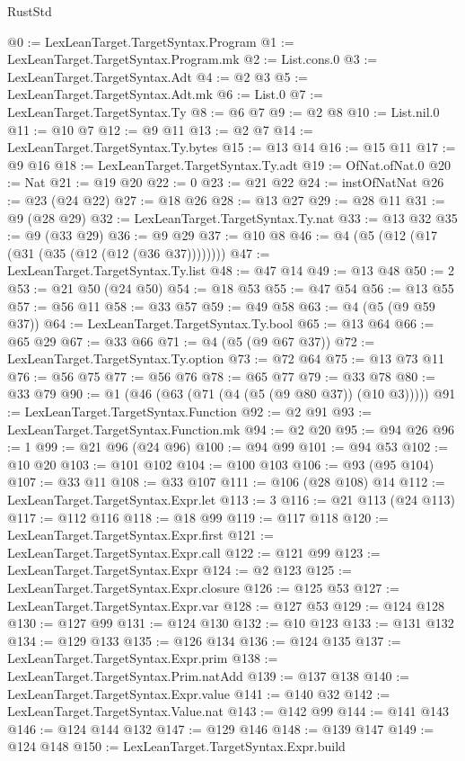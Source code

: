 \begin{lexlean}{RustStd}
\begin{coremodule}
@0 := LexLeanTarget.TargetSyntax.Program
@1 := LexLeanTarget.TargetSyntax.Program.mk
@2 := List.cons.{0}
@3 := LexLeanTarget.TargetSyntax.Adt
@4 := @2 @3
@5 := LexLeanTarget.TargetSyntax.Adt.mk
@6 := List.{0}
@7 := LexLeanTarget.TargetSyntax.Ty
@8 := @6 @7
@9 := @2 @8
@10 := List.nil.{0}
@11 := @10 @7
@12 := @9 @11
@13 := @2 @7
@14 := LexLeanTarget.TargetSyntax.Ty.bytes
@15 := @13 @14
@16 := @15 @11
@17 := @9 @16
@18 := LexLeanTarget.TargetSyntax.Ty.adt
@19 := OfNat.ofNat.{0}
@20 := Nat
@21 := @19 @20
@22 := 0
@23 := @21 @22
@24 := instOfNatNat
@26 := @23 (@24 @22)
@27 := @18 @26
@28 := @13 @27
@29 := @28 @11
@31 := @9 (@28 @29)
@32 := LexLeanTarget.TargetSyntax.Ty.nat
@33 := @13 @32
@35 := @9 (@33 @29)
@36 := @9 @29
@37 := @10 @8
@46 := @4 (@5 (@12 (@17 (@31 (@35 (@12 (@12 (@36 @37))))))))
@47 := LexLeanTarget.TargetSyntax.Ty.list
@48 := @47 @14
@49 := @13 @48
@50 := 2
@53 := @21 @50 (@24 @50)
@54 := @18 @53
@55 := @47 @54
@56 := @13 @55
@57 := @56 @11
@58 := @33 @57
@59 := @49 @58
@63 := @4 (@5 (@9 @59 @37))
@64 := LexLeanTarget.TargetSyntax.Ty.bool
@65 := @13 @64
@66 := @65 @29
@67 := @33 @66
@71 := @4 (@5 (@9 @67 @37))
@72 := LexLeanTarget.TargetSyntax.Ty.option
@73 := @72 @64
@75 := @13 @73 @11
@76 := @56 @75
@77 := @56 @76
@78 := @65 @77
@79 := @33 @78
@80 := @33 @79
@90 := @1 (@46 (@63 (@71 (@4 (@5 (@9 @80 @37)) (@10 @3)))))
@91 := LexLeanTarget.TargetSyntax.Function
@92 := @2 @91
@93 := LexLeanTarget.TargetSyntax.Function.mk
@94 := @2 @20
@95 := @94 @26
@96 := 1
@99 := @21 @96 (@24 @96)
@100 := @94 @99
@101 := @94 @53
@102 := @10 @20
@103 := @101 @102
@104 := @100 @103
@106 := @93 (@95 @104)
@107 := @33 @11
@108 := @33 @107
@111 := @106 (@28 @108) @14
@112 := LexLeanTarget.TargetSyntax.Expr.let
@113 := 3
@116 := @21 @113 (@24 @113)
@117 := @112 @116
@118 := @18 @99
@119 := @117 @118
@120 := LexLeanTarget.TargetSyntax.Expr.first
@121 := LexLeanTarget.TargetSyntax.Expr.call
@122 := @121 @99
@123 := LexLeanTarget.TargetSyntax.Expr
@124 := @2 @123
@125 := LexLeanTarget.TargetSyntax.Expr.closure
@126 := @125 @53
@127 := LexLeanTarget.TargetSyntax.Expr.var
@128 := @127 @53
@129 := @124 @128
@130 := @127 @99
@131 := @124 @130
@132 := @10 @123
@133 := @131 @132
@134 := @129 @133
@135 := @126 @134
@136 := @124 @135
@137 := LexLeanTarget.TargetSyntax.Expr.prim
@138 := LexLeanTarget.TargetSyntax.Prim.natAdd
@139 := @137 @138
@140 := LexLeanTarget.TargetSyntax.Expr.value
@141 := @140 @32
@142 := LexLeanTarget.TargetSyntax.Value.nat
@143 := @142 @99
@144 := @141 @143
@146 := @124 @144 @132
@147 := @129 @146
@148 := @139 @147
@149 := @124 @148
@150 := LexLeanTarget.TargetSyntax.Expr.build

\end{coremodule}
\end{lexlean}
